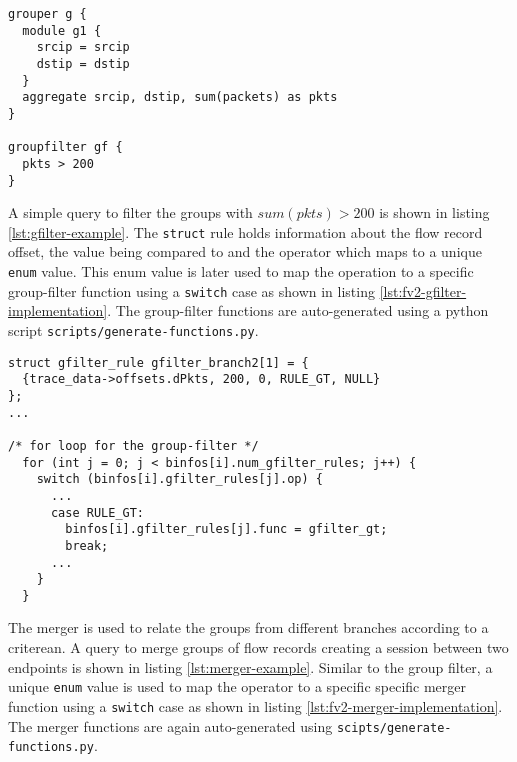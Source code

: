 \begin{lstlisting}
grouper g {
  module g1 {
    srcip = srcip
    dstip = dstip
  }
  aggregate srcip, dstip, sum(packets) as pkts
}

groupfilter gf {
  pkts > 200
}
\end{lstlisting}

A simple query to filter the groups with $sum(pkts) > 200$ is shown in listing
\ref{lst:gfilter-example}. The \texttt{struct} rule holds information about
the flow record offset, the value 
being compared to and the operator which maps to a unique \texttt{enum} value.
This enum value is later used to map the operation to a specific group-filter
function using a \texttt{switch} case as shown in listing
\ref{lst:fv2-gfilter-implementation}. The group-filter functions are
auto-generated using a python script \texttt{scripts/generate-functions.py}.

\begin{lstlisting}
struct gfilter_rule gfilter_branch2[1] = {
  {trace_data->offsets.dPkts, 200, 0, RULE_GT, NULL}
};
...

/* for loop for the group-filter */
  for (int j = 0; j < binfos[i].num_gfilter_rules; j++) {
    switch (binfos[i].gfilter_rules[j].op) {
      ...
      case RULE_GT:
        binfos[i].gfilter_rules[j].func = gfilter_gt;
        break;
      ...
    }
  }
\end{lstlisting}

The merger is used to relate the groups from different branches according to a
criterean. A query to merge groups of flow records creating a session between
two endpoints is shown in listing \ref{lst:merger-example}. Similar to the
group filter, a unique  \texttt{enum} value
is used to map the operator to a specific specific merger function using a
\texttt{switch} case as shown in listing \ref{lst:fv2-merger-implementation}.
The merger functions are again auto-generated using
\texttt{scipts/generate-functions.py}.


